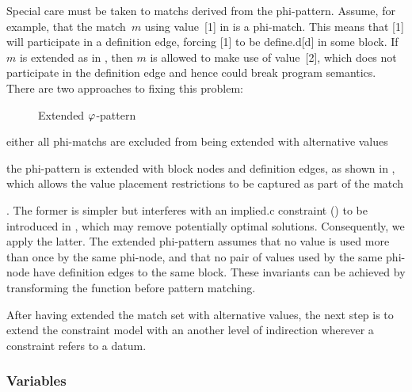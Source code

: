 Special care must be taken to \glspl{match} derived from the \gls{phi-pattern}.
%
Assume, for example, that the \gls{match}~$m$ using value~[1] in
 is a \gls{phi-match}.
%
This means that [1] will participate in a \gls{definition edge},
forcing [1] to be \gls{define.d}[d] in some \gls{block}.
%
If $m$ is extended as in , then $m$ is
allowed to make use of value~[2], which does not participate in the
\gls{definition edge} and hence could break \gls{program} semantics.
%
There are two approaches to fixing this problem:
%
\begin{figure}
  \centering%
  

  \caption{Extended $\varphi$-pattern}
\end{figure}
%
\begin{inlinelist}[label=(\roman*), itemjoin={; }, itemjoin*={; or\ }]
  \item either all \glspl{phi-match} are excluded from being extended with
    \glspl{alternative value}
  \item the \gls{phi-pattern} is extended with \glspl{block node} and
    \glspl{definition edge}, as shown in , which
    allows the value placement restrictions to be captured as part of the
    \gls{match}
\end{inlinelist}.
%
The former is simpler but interferes with an \gls{implied.c} \gls{constraint}
() to be introduced in
, which may remove potentially optimal
\glspl{solution}.
%
Consequently, we apply the latter.
%
The extended \gls{phi-pattern} assumes that no value is used more than once by
the same \gls{phi-node}, and that no pair of values used by the same
\gls{phi-node} have \glspl{definition edge} to the same \gls{block}.
%
These invariants can be achieved by transforming the \gls{function} before
\gls{pattern matching}.

After having extended the \gls{match set} with \glspl{alternative value}, the
next step is to extend the \gls{constraint model} with an another level of
indirection wherever a \gls{constraint} refers to a \gls{datum}.


\subsubsection{Variables}

